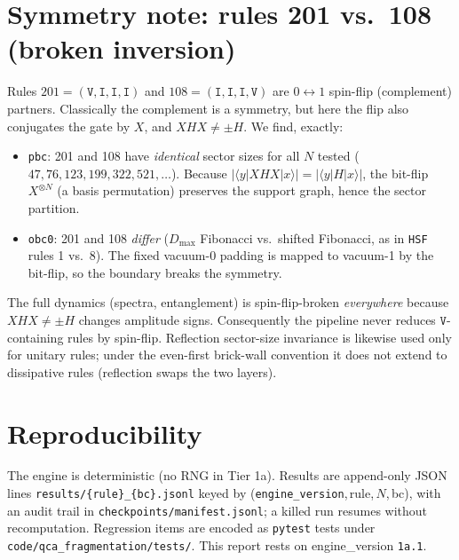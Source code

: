 \documentclass[11pt]{article}
\newcommand{\rt}[1]{\texttt{#1}}
\begin{document}
\section{Symmetry note: rules 201 vs.\ 108 (broken inversion)}
Rules $201=(\rt V,\rt I,\rt I,\rt I)$ and $108=(\rt I,\rt I,\rt I,\rt V)$ are
$0\!\leftrightarrow\!1$ spin-flip (complement) partners. Classically the
complement is a symmetry, but here the flip also conjugates the gate by $X$, and
$XHX\neq\pm H$. We find, exactly:
\begin{itemize}
  \item \rt{pbc}: 201 and 108 have \emph{identical} sector sizes for all $N$
  tested ($47,76,123,199,322,521,\dots$). Because $|\langle y|XHX|x\rangle|=
  |\langle y|H|x\rangle|$, the bit-flip $X^{\otimes N}$ (a basis permutation)
  preserves the support graph, hence the sector partition.
  \item \rt{obc0}: 201 and 108 \emph{differ} ($D_{\max}$ Fibonacci vs.\ shifted
  Fibonacci, as in \rt{HSF} rules 1 vs.\ 8). The fixed vacuum-0 padding is mapped
  to vacuum-1 by the bit-flip, so the boundary breaks the symmetry.
\end{itemize}
The full dynamics (spectra, entanglement) is spin-flip-broken \emph{everywhere}
because $XHX\neq\pm H$ changes amplitude signs. Consequently the pipeline never
reduces $\rt V$-containing rules by spin-flip. Reflection sector-size invariance
is likewise used only for unitary rules; under the even-first brick-wall
convention it does not extend to dissipative rules (reflection swaps the two
layers).

\section{Reproducibility}
The engine is deterministic (no RNG in Tier 1a). Results are append-only JSON
lines \rt{results/\{rule\}\_\{bc\}.jsonl} keyed by
(\rt{engine\_version},\,rule,\,$N$,\,bc), with an audit trail in
\rt{checkpoints/manifest.jsonl}; a killed run resumes without recomputation.
Regression items are encoded as \rt{pytest} tests under
\rt{code/qca\_fragmentation/tests/}. This report rests on engine\_version
\texttt{1a.1}.
\end{document}
